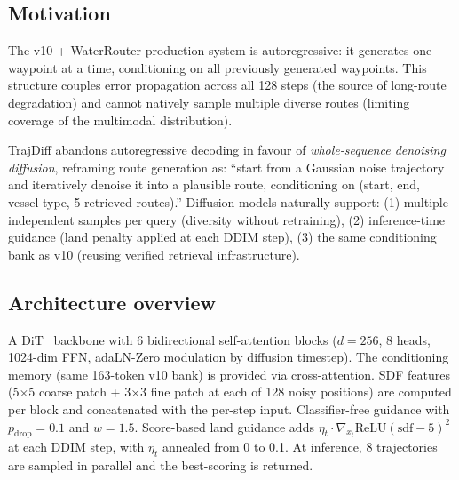 \documentclass[11pt,a4paper]{article}
\begin{document}
\subsection{Motivation}

The v10 + WaterRouter production system is autoregressive: it generates one
waypoint at a time, conditioning on all previously generated waypoints.
This structure couples error propagation across all 128 steps (the source of
long-route degradation) and cannot natively sample multiple diverse routes
(limiting coverage of the multimodal distribution).

TrajDiff abandons autoregressive decoding in favour of
\emph{whole-sequence denoising diffusion}, reframing route generation as:
``start from a Gaussian noise trajectory and iteratively denoise it into a
plausible route, conditioning on (start, end, vessel-type, 5 retrieved routes).''
Diffusion models naturally support:
(1) multiple independent samples per query (diversity without retraining),
(2) inference-time guidance (land penalty applied at each DDIM step),
(3) the same conditioning bank as v10 (reusing verified retrieval infrastructure).

\subsection{Architecture overview}

A DiT~\cite{peebles2023dit} backbone with 6 bidirectional self-attention blocks
($d=256$, 8 heads, 1024-dim FFN, adaLN-Zero modulation by diffusion timestep).
The conditioning memory (same 163-token v10 bank) is provided via cross-attention.
SDF features (5$\times$5 coarse patch + 3$\times$3 fine patch at each of 128 noisy
positions) are computed per block and concatenated with the per-step input.
Classifier-free guidance with $p_\text{drop}=0.1$ and $w=1.5$.
Score-based land guidance adds $\eta_t \cdot \nabla_{x_t} \text{ReLU}(\text{sdf}-5)^2$
at each DDIM step, with $\eta_t$ annealed from 0 to 0.1.
At inference, 8 trajectories are sampled in parallel and the best-scoring is returned.
\end{document}
